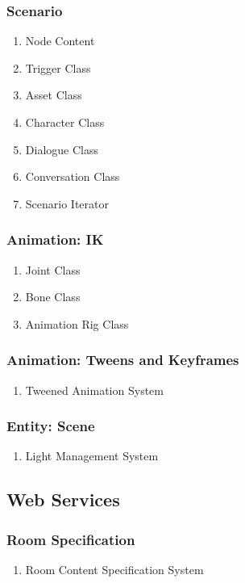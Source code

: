 \subsubsection{Scenario}
\begin{enumerate}
\item Node Content
\item Trigger Class
\item Asset Class
\item Character Class
\item Dialogue Class
\item Conversation Class
\item Scenario Iterator
\end{enumerate}
\subsubsection{Animation: IK}
\begin{enumerate}
\item Joint Class
\item Bone Class
\item Animation Rig Class
\end{enumerate}
\subsubsection{Animation: Tweens and Keyframes}
\begin{enumerate}
\item Tweened Animation System
\end{enumerate}
\subsubsection{Entity: Scene}
\begin{enumerate}
\item Light Management System
\end{enumerate}



\subsection{Web Services}
\subsubsection{Room Specification}
\begin{enumerate}
\item Room Content Specification System
\end{enumerate} 
